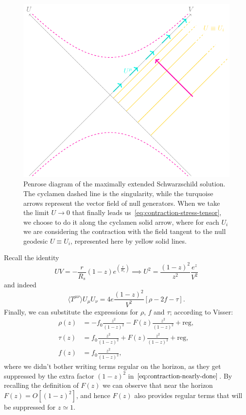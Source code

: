 \begin{figure}
    \centering
    \includegraphics[scale=1.1]{Immagini/Kruskal-extension/Kruskal-extension.pdf}
    \caption{Penrose diagram of the maximally extended Schwarzschild solution. The cyclamen dashed line is the singularity, while the turquoise arrows represent the vector field of null generators. When we take the limit \(U\rightarrow 0\) that finally leads us~\eqref{eq:contraction-stress-tensor}, we choose to do it along the cyclamen solid arrow, where for each \(U_i\) we are considering the contraction with the field tangent to the null geodesic \(U \equiv U_i\), represented here by yellow solid lines.}
    \label{fig:Penrose-diagran-Kruskal-extension}
\end{figure}
Recall the identity
\[
UV = - \frac{r}{R_s} (1 - z) e^(\frac{r}{R_s}) \implies U^2 = \frac{(1 - z)^2}{z^2}  \frac{e^z}{V^2}
\]
and indeed
\begin{equation}
    \label{eq:contraction-nearly-done}
    \langle T^{\mu\nu}\rangle U_{\mu}U_{\nu} = 4e\frac{(1 - z)^2}{V^2}\left[\rho - 2f - \tau\right]. 
\end{equation}
Finally, we can substitute the expressions for \(\rho\), \(f\) and \(\tau\); according to Visser:
\begin{align*}
    \rho(z) &= -f_0 \frac{z^2}{(1 - z)^2} - F(z) \frac{z^2}{(1 - z)^2} + \text{reg}, \\
    \tau(z) &= f_0 \frac{z^2}{(1 - z)^2} + F(z) \frac{z^2}{(1 - z)^2} + \text{reg}, \\
    f(z) &= f_0 \frac{z^2}{(1 - z)^2},
\end{align*}
where we didn't bother writing terms regular on the horizon, as they get suppressed by the extra factor \((1 - z)^2\) in \(\eqref{eq:contraction-nearly-done}\). By recalling the definition of \(F(z)\) we can observe that near the horizon \(F(z) = O[(1 - z)^2]\), and hence \(F(z)\) also provides regular terms that will be suppressed for \(z \simeq 1\).

